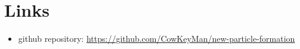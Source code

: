 \chapter{Links}

\begin{itemize}
	\item github repository: \url{https://github.com/CowKeyMan/new-particle-formation}
\end{itemize}